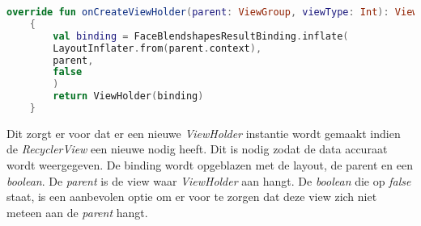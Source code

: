\begin{lstlisting}[language=Kotlin, caption=onCreateViewHolder in FaceBlendshapesResultAdapter, label={lst:onCreateViewHolder}]
    override fun onCreateViewHolder(parent: ViewGroup, viewType: Int): ViewHolder
    {
        val binding = FaceBlendshapesResultBinding.inflate(
        LayoutInflater.from(parent.context),
        parent,
        false
        )
        return ViewHolder(binding)
    }
\end{lstlisting}
Dit zorgt er voor dat er een nieuwe \emph{ViewHolder} instantie wordt gemaakt indien de \emph{RecyclerView} een nieuwe nodig heeft. Dit is nodig zodat de data accuraat wordt weergegeven. De binding wordt opgeblazen met de layout, de parent en een \emph{boolean}. De \emph{parent} is de view waar \emph{ViewHolder} aan hangt. De \emph{boolean} die op \emph{false} staat, is een aanbevolen optie om er voor te zorgen dat deze view zich niet meteen aan de \emph{parent} hangt.

